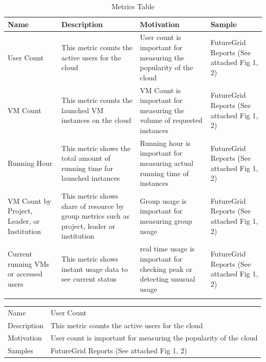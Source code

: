 \documentclass{sig-alternate}
\begin{document}
\begin{table}[htb]

\caption{Metrics Table}
\label{T:metrics}
\bigskip
\begin{tabular}{p{}p{}p{}p{}}
Name & Description & Motivation & Sample \\
\hline
User Count & 
This metric counts the active users for the cloud &
User count is important for measuring the popularity of the cloud & 
FutureGrid Reports (See attached Fig 1, 2) \\
\hline
VM Count & 
This metric counts the launched VM instances on the cloud &
VM Count is important for measuring the volume of requested instances &
FutureGrid Reports (See attached Fig 1, 2) \\
\hline
Running Hour &
This metric shows the total amount of running time for launched instances &
Running hour is important for measuring actual running time of instances &
FutureGrid Reports (See attached Fig 1, 2) \\
\hline
VM Count by Project, Leader, or Institution &
This metric shows share of resource by group metrics such as project, leader or institution &
Group usage is important for measuring group usage &
FutureGrid Reports (See attached Fig 1, 2) \\
\hline
Current running VMs or accessed users &
This metric shows instant usage data to see current status &
real time usage is important for checking peak or detecting unusual usage &
FutureGrid Reports (See attached Fig 1, 2) \\
\hline
\end{description}


\end{tabular}

\end{table}



\flushleft
\begin{tabular}{p{}p{}}
{\bf\it\small} Name &  User Count \\
{\bf\it\small} Description & This metric counts the active users for the cloud \\
{\bf\it\small} Motivation & User count is important for measuring the popularity of the cloud\\
{\bf\it\small} Samples & FutureGrid Reports (See attached Fig 1, 2) \\
\end{tabular}
\end{document}
